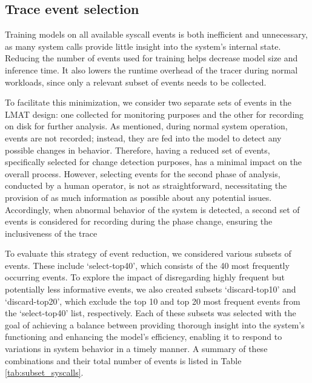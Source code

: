 \documentclass[preprint,12pt]{elsarticle}
\begin{document}
\subsection{Trace event selection}
Training models on all available syscall events is both inefficient and unnecessary, as many system calls provide little insight into the system’s internal state. Reducing the number of events used for training helps decrease model size and inference time. It also lowers the runtime overhead of the tracer during normal workloads, since only a relevant subset of events needs to be collected.

To facilitate this minimization, we consider two separate sets of events in the LMAT design: one collected for monitoring purposes and the other for recording on disk for further analysis. As mentioned, during normal system operation, events are not recorded; instead, they are fed into the model to detect any possible changes in behavior. Therefore, having a reduced set of events, specifically selected for change detection purposes, has a minimal impact on the overall process. However, selecting events for the second phase of analysis, conducted by a human operator, is not as straightforward, necessitating the provision of as much information as possible about any potential issues. Accordingly, when abnormal behavior of the system is detected, {a second set of events is considered} for recording during the phase change, ensuring the inclusiveness of the trace

To evaluate this strategy of event reduction, we considered various subsets of events. These include `select-top40', which consists of the 40 most frequently occurring events. To explore the impact of disregarding highly frequent but potentially less informative events, we also created subsets `discard-top10' and `discard-top20', which exclude the top 10 and top 20 most frequent events from the `select-top40' list, respectively. Each of these subsets was selected with the goal of achieving a balance between providing thorough insight into the system's functioning and enhancing the model's efficiency, enabling it to respond to variations in system behavior in a timely manner. A summary of these combinations and their total number of events is listed in Table \ref{tab:subset_syscalls}.
\end{document}
